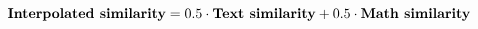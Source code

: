 \begin{equation}
  \text{\textbf{Interpolated similarity}} =
    0.5\cdot\text{\textbf{Text similarity}} +
    0.5\cdot\text{\textbf{Math similarity}}
\end{equation}
